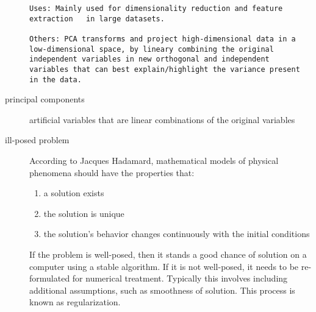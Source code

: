 \documentclass[
]{book}
\providecommand{\tightlist}{%
  \setlength{\itemsep}{0pt}\setlength{\parskip}{0pt}}
\begin{document}
\begin{description}
\begin{verbatim}
Uses: Mainly used for dimensionality reduction and feature extraction   in large datasets.

Others: PCA transforms and project high-dimensional data in a low-dimensional space, by lineary combining the original independent variables in new orthogonal and independent variables that can best explain/highlight the variance present in the data.
\end{verbatim}
\item[principal components]
artificial variables that are linear combinations of the original variables
\item[ill-posed problem]
According to Jacques Hadamard, mathematical models of physical phenomena should have the properties that:

\begin{enumerate}
\def\labelenumi{\arabic{enumi}.}
\tightlist
\item
  a solution exists
\item
  the solution is unique
\item
  the solution's behavior changes continuously with the initial conditions
\end{enumerate}

If the problem is well-posed, then it stands a good chance of solution on a computer using a stable algorithm. If it is not well-posed, it needs to be re-formulated for numerical treatment. Typically this involves including additional assumptions, such as smoothness of solution. This process is known as regularization.


\end{description}
\end{document}

